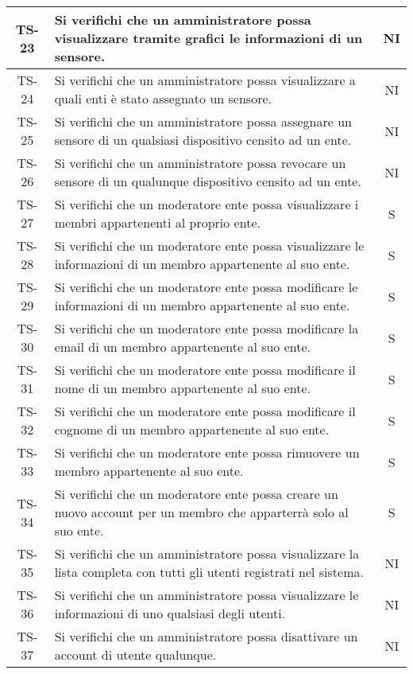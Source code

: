 \begin{center}
\begin{longtable}{|c|p{10cm}|c|}
			 \hline
			 TS-23 & Si verifichi che un amministratore possa visualizzare tramite grafici le informazioni di un sensore. & NI \\
			 \hline
			 TS-24 & Si verifichi che un amministratore possa visualizzare a quali enti è stato assegnato un sensore. & NI \\
			 \hline
			 TS-25 & Si verifichi che un amministratore possa assegnare un sensore di un qualsiasi dispositivo censito ad un ente. & NI \\
			 \hline
			 TS-26 & Si verifichi che un amministratore possa revocare un sensore di un qualunque dispositivo censito ad un ente. & NI \\
			 \hline
			 TS-27 &  Si verifichi che un moderatore ente possa visualizzare i membri appartenenti al proprio ente. & S \\
			 \hline
			 TS-28 & Si verifichi che un moderatore ente possa visualizzare le informazioni di un membro appartenente al suo ente. & S \\
			 \hline
			 TS-29 & Si verifichi che un moderatore ente possa modificare le informazioni di un membro appartenente al suo ente. & S \\
			 \hline
			 TS-30 & Si verifichi che un moderatore ente possa modificare la email di un membro appartenente al suo ente. & S \\
			 \hline
			 TS-31 & Si verifichi che un moderatore ente possa modificare il nome di un membro appartenente al suo ente. & S \\
			 \hline
			 TS-32 & Si verifichi che un moderatore ente possa modificare il cognome di un membro appartenente al suo ente. & S \\
			 \hline
			 TS-33 & Si verifichi che un moderatore ente possa rimuovere un membro appartenente al suo ente. & S \\
			 \hline
			 TS-34 & Si verifichi che un moderatore ente possa creare un nuovo account per un membro che apparterrà solo al suo ente. & S \\
			 \hline
			 TS-35 & Si verifichi che un amministratore possa visualizzare la lista completa con tutti gli utenti registrati nel sistema. & NI \\
			 \hline
			 TS-36 & Si verifichi che un amministratore possa visualizzare le informazioni di uno qualsiasi degli utenti. & NI \\
			 \hline
			 TS-37 & Si verifichi che un amministratore possa disattivare un account di utente qualunque. & NI \\
			 \hline

\end{longtable}
\end{center}
